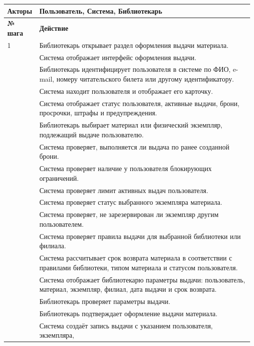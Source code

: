 \documentclass[12pt,a4paper]{article}
\begin{document}
\begin{xltabular}{\textwidth}{
				|>{\raggedright\arraybackslash}p{2.7cm}
				|>{\raggedright\arraybackslash}X|
			}
			\textbf{Акторы} &
			Пользователь, Система, Библиотекарь \\
			\hline
			
			
			\textbf{№ шага} & \textbf{Действие} \\
			\hline
			
			1 & Библиотекарь открывает раздел оформления выдачи материала. \\
			 & Система отображает интерфейс оформления выдачи. \\
			 & Библиотекарь идентифицирует пользователя в системе по ФИО,
			e-mail, номеру читательского билета или другому идентификатору. \\
			 & Система находит пользователя и отображает его карточку. \\
			 & Система отображает статус пользователя, активные выдачи, брони,
			просрочки, штрафы и предупреждения. \\
			 & Библиотекарь выбирает материал или физический экземпляр,
			подлежащий выдаче пользователю. \\
			 & Система проверяет, выполняется ли выдача по ранее созданной брони. \\
			 & Система проверяет наличие у пользователя блокирующих ограничений. \\
			 & Система проверяет лимит активных выдач пользователя. \\
			 & Система проверяет статус выбранного экземпляра материала. \\
			 & Система проверяет, не зарезервирован ли экземпляр другим
			пользователем. \\
			 & Система проверяет правила выдачи для выбранной библиотеки или
			филиала. \\
			 & Система рассчитывает срок возврата материала в соответствии с
			правилами библиотеки, типом материала и статусом пользователя. \\
			 & Система отображает библиотекарю параметры выдачи: пользователь,
			материал, экземпляр, филиал, дата выдачи и срок возврата. \\
			 & Библиотекарь проверяет параметры выдачи. \\
			 & Библиотекарь подтверждает оформление выдачи материала. \\
			 & Система создаёт запись выдачи с указанием пользователя, экземпляра,

\end{xltabular}
\end{document}
